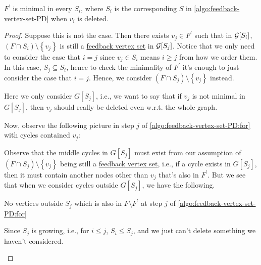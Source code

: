 \begin{lemma}\label{lma:lec4-3}
	\(F^\prime \) is minimal in every \(S_i\), where \(S_i\) is the corresponding \(S\) in \autoref{algo:feedback-vertex-set-PD} when \(v_i\) is deleted.
\end{lemma}
\begin{proof}
	Suppose this is not the case. Then there exists \(v_j\in F^\prime \) such that in \(\mathcal{\MakeUppercase{g}} [S_i]\), \((F \cap S_i) \setminus \left\{ v_{j}  \right\}\) is still a \hyperref[prb:feedback-vertex-set]{feedback vertex set} in \(\mathcal{\MakeUppercase{g}} [S_j]\). Notice that we only need to consider the case that \(i = j\) since \(v_{j}\in S_i\) means \(i \geq j\) from how we order them. In this case, \(S_j \subseteq S_i\), hence to check the minimality of \(F^\prime \) it's enough to just consider the case that \(i = j\). Hence, we consider \((F \cap S_j) \setminus \left\{ v_{j}  \right\}\) instead.

	\begin{note}
		Here we only consider \(G[S_j]\), i.e., we want to say that if \(v_j\) is not minimal in \(G[S_j]\), then \(v_j\) should really be deleted even w.r.t. the whole graph.
	\end{note}

	Now, observe the following picture in step \(j\) of \autoref{algo:feedback-vertex-set-PD:for} with cycles contained \(v_j\):
	\begin{figure}[H]
		\centering
	\end{figure}

	Observe that the middle cycles in \(G[S_j]\) must exist from our assumption of \((F \cap S_j) \setminus \left\{ v_{j}  \right\}\) being still a \hyperref[prb:feedback-vertex-set]{feedback vertex set}, i.e., if a cycle exists in \(G[S_j]\), then it must contain another nodes other than \(v_j\) that's also in \(F^\prime \). But we see that when we consider cycles outside \(G[S_j]\), we have the following.
	\begin{claim}
		No vertices outside \(S_j\) which is also in \(F\setminus F^\prime \) at step \(j\) of \autoref{algo:feedback-vertex-set-PD:for}
	\end{claim}
	\begin{explanation}
		Since \(S_j\) is growing, i.e., for \(i \leq j\), \(S_i \leq S_j\), and we just can't delete something we haven't considered.
	\end{explanation}


\end{proof}
